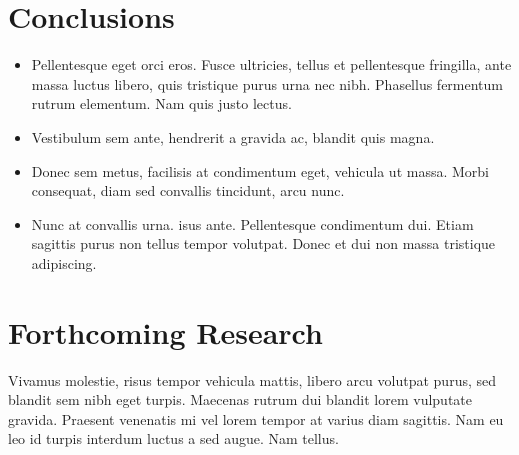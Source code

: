 \documentclass[a0,landscape]{a0poster}
\begin{document}
\begin{multicols}{4}

\color{SaddleBrown} %

\section*{Conclusions}

\begin{itemize}
\item Pellentesque eget orci eros. Fusce ultricies, tellus et pellentesque fringilla, ante massa luctus libero, quis tristique purus urna nec nibh. Phasellus fermentum rutrum elementum. Nam quis justo lectus.
\item Vestibulum sem ante, hendrerit a gravida ac, blandit quis magna.
\item Donec sem metus, facilisis at condimentum eget, vehicula ut massa. Morbi consequat, diam sed convallis tincidunt, arcu nunc.
\item Nunc at convallis urna. isus ante. Pellentesque condimentum dui. Etiam sagittis purus non tellus tempor volutpat. Donec et dui non massa tristique adipiscing.
\end{itemize}

\color{DarkSlateGray} %


\section*{Forthcoming Research}

Vivamus molestie, risus tempor vehicula mattis, libero arcu volutpat purus, sed blandit sem nibh eget turpis. Maecenas rutrum dui blandit lorem vulputate gravida. Praesent venenatis mi vel lorem tempor at varius diam sagittis. Nam eu leo id turpis interdum luctus a sed augue. Nam tellus.



\end{multicols}
\end{document}
